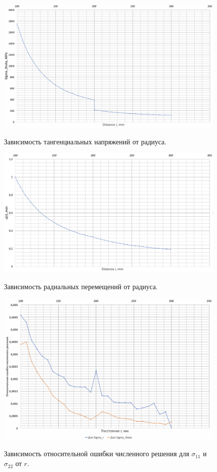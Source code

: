 \documentclass[a4paper,12pt]{article}	%
\begin{document}
\begin{figure}[H]
  \centering
  \includegraphics[scale=0.5]{img/Sigma_theta_2.png}\\
  \caption{Зависимость тангенциальных напряжений от радиуса.}
  \label{fig_16}
\end{figure}

\begin{figure}[H]
  \centering
  \includegraphics[scale=0.5]{img/u(r).png}\\
  \caption{Зависимость радиальных перемещений от радиуса.}
  \label{fig_17}
\end{figure}

\begin{figure}[H]
  \centering
  \includegraphics[scale=0.5]{img/error_Stress.png}\\
  \caption{Зависимость относительной ошибки численного решения для $\sigma_{11}$ и $\sigma_{22}$ от $r$.}
  \label{fig_18}
\end{figure}
\end{document}
